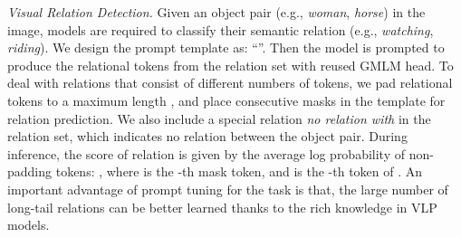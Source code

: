 \documentclass[11pt]{article}
\begin{document}
\smallskip
\textit{Visual Relation Detection.} Given an object pair  (e.g., \textit{woman}, \textit{horse}) in the image, models are required to classify their semantic relation  (e.g., \textit{watching}, \textit{riding}). We design the prompt template as: ``''. Then the model is prompted to produce the relational tokens from the relation set with reused GMLM head. To deal with relations that consist of different numbers of tokens, we pad relational tokens to a maximum length , and place  consecutive masks in the template for relation prediction. We also include a special relation \textit{no relation with} in the relation set, which indicates no relation between the object pair. During inference, the score of relation  is given by the average log probability of non-padding tokens: , where  is the -th mask token, and  is the -th token of . An important advantage of prompt tuning for the task is that, the large number of long-tail relations can be better learned thanks to the rich knowledge in VLP models.







\begin{table}[t]
    \begin{center}
    \small
    \caption{Experimental results of visual commonsense reasoning on VCR validation (and test) sets. }
    \label{tab:vcr}
\end{center}
\end{table}
\end{document}
